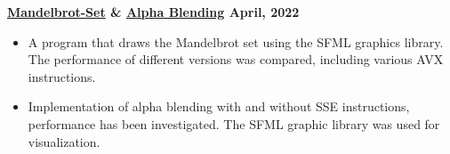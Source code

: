 \textbf{\href{https://github.com/jirol9xa/Mandelbrot Set} {Mandelbrot-Set} \& 
\href{https://github.com/jirol9xa/Alpha-Blending} {
Alpha Blending} \hfill April, 2022}\par

\begin{itemize}
	\item A program that draws the Mandelbrot set using the SFML graphics library. The performance of different versions was compared, including various AVX instructions.
	\item Implementation of alpha blending with and without SSE instructions, performance has been investigated. The SFML graphic library was used for visualization.
\end{itemize}\par